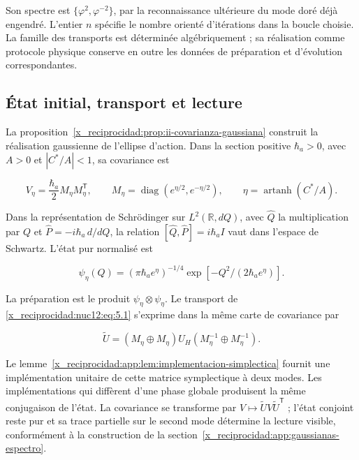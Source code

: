 Son spectre est \(\{\varphi^2,\varphi^{-2}\}\), par la reconnaissance ultérieure du mode doré déjà engendré. L’entier \(n\) spécifie le nombre orienté d’itérations dans la boucle choisie. La famille des transports est déterminée algébriquement ; sa réalisation comme protocole physique conserve en outre les données de préparation et d’évolution correspondantes.

\subsection{État initial, transport et lecture}

La proposition~\ref{x_reciprocidad:prop:ii-covarianza-gaussiana} construit la réalisation gaussienne de l’ellipse d’action. Dans la section positive \(\hbar_a>0\), avec \(A>0\) et \(|C^*/A|<1\), sa covariance est



\begin{equation}
V_\eta=\frac{\hbar_a}{2}M_\eta M_\eta^{\mathsf T},\qquad
M_\eta=\operatorname{diag}(e^{\eta/2},e^{-\eta/2}),\qquad
\eta=\operatorname{artanh}(C^*/A).
\label{x_reciprocidad:nuc12:eq:5.4}
\end{equation}



Dans la représentation de Schrödinger sur \(L^2(\mathbb R,dQ)\), avec \(\widehat Q\) la multiplication par \(Q\) et \(\widehat P=-i\hbar_a\,d/dQ\), la relation \([\widehat Q,\widehat P]=i\hbar_a I\) vaut dans l’espace de Schwartz. L’état pur normalisé est



\[
\psi_\eta(Q)=(\pi\hbar_a e^\eta)^{-1/4}
\exp[-Q^2/(2\hbar_a e^\eta)].
\]



La préparation est le produit \(\psi_\eta\otimes\psi_\eta\). Le transport de \eqref{x_reciprocidad:nuc12:eq:5.1} s’exprime dans la même carte de covariance par




\begin{equation}
\widetilde U=(M_\eta\oplus M_\eta)U_H
(M_\eta^{-1}\oplus M_\eta^{-1}).
\label{x_reciprocidad:nuc12:eq:5.5}
\end{equation}



Le lemme~\ref{x_reciprocidad:app:lem:implementacion-simplectica} fournit une implémentation unitaire de cette matrice symplectique à deux modes. Les implémentations qui diffèrent d’une phase globale produisent la même conjugaison de l’état. La covariance se transforme par \(V\mapsto\widetilde U V\widetilde U^{\mathsf T}\) ; l’état conjoint reste pur et sa trace partielle sur le second mode détermine la lecture visible, conformément à la construction de la section~\ref{x_reciprocidad:app:gaussianas-espectro}.

